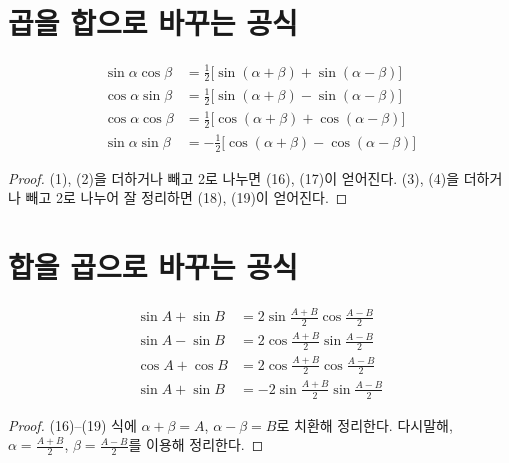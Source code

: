 \documentclass{article}
\renewcommand\a{\ensuremath{\alpha}}
\renewcommand\b{\ensuremath{\beta}}
\begin{document}
\section{곱을 합으로 바꾸는 공식}
\begin{align}
\sin\a\cos\b&=\frac12\big[\sin(\a+\b)+\sin(\a-\b)\big]\\
\cos\a\sin\b&=\frac12\big[\sin(\a+\b)-\sin(\a-\b)\big]\\
\cos\a\cos\b&=\frac12\big[\cos(\a+\b)+\cos(\a-\b)\big]\\
\sin\a\sin\b&=-\frac12\big[\cos(\a+\b)-\cos(\a-\b)\big]
\end{align}
\begin{proof}
(1), (2)을 더하거나 빼고 2로 나누면 (16), (17)이 얻어진다.
(3), (4)을 더하거나 빼고 2로 나누어 잘 정리하면 (18), (19)이 얻어진다.
\end{proof}

\section{합을 곱으로 바꾸는 공식}
\begin{align}
\sin A+\sin B&=2\sin\frac{A+B}2\cos\frac{A-B}2\\
\sin A-\sin B&=2\cos\frac{A+B}2\sin\frac{A-B}2\\
\cos A+\cos B&=2\cos\frac{A+B}2\cos\frac{A-B}2\\
\sin A+\sin B&=-2\sin\frac{A+B}2\sin\frac{A-B}2
\end{align}
\begin{proof}
(16)--(19) 식에 \(\a+\b=A\), \(\a-\b=B\)로 치환해 정리한다.
다시말해, \(\a=\frac{A+B}2\), \(\b=\frac{A-B}2\)를 이용해 정리한다.
\end{proof}
\end{document}

